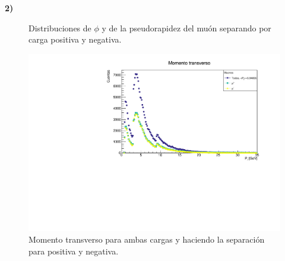 \documentclass[11pt]{article}
\begin{document}
\textbf{2)}
\begin{figure}[H]
\centering
{}

\caption{Distribuciones de $\phi$ y de la pseudorapidez del muón separando por carga positiva y negativa.}
\label{fig:Prob2}
\end{figure}

\begin{figure}[H]
\centering
\includegraphics[width=1\textwidth]{../Figuras/Prob3.pdf}
\caption{Momento transverso para ambas cargas y haciendo la separación para positiva y negativa.}
\label{fig:Prob3}
\end{figure}
\end{document}
